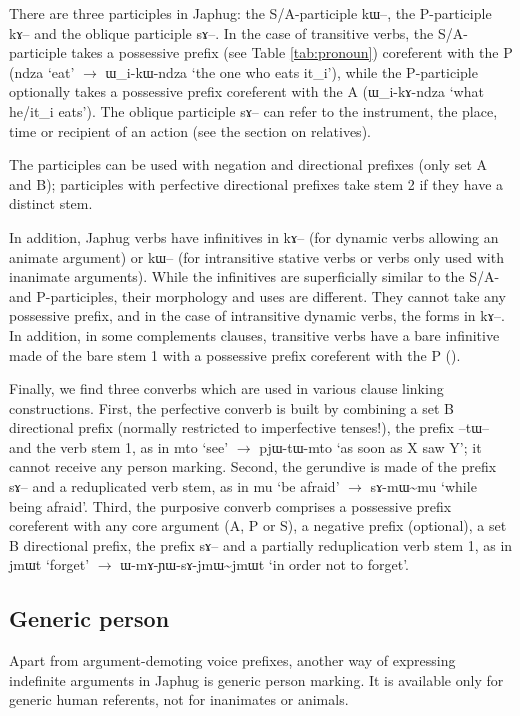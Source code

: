 \documentclass[oldfontcommands,oneside,a4paper,11pt]{article}
\newcommand{\ipa}[1]{{\phon #1}} %
\begin{document}
There are three participles in Japhug: the S/A-participle \ipa{kɯ--}, the P-participle \ipa{kɤ--} and the oblique participle \ipa{sɤ--}. In the case of transitive verbs, the S/A-participle takes a possessive prefix (see Table \ref{tab:pronoun}) coreferent with the P (\ipa{ndza} `eat' $\rightarrow$ \ipa{ɯ_i-kɯ-ndza} `the one who eats it_i'), while the P-participle optionally takes a possessive prefix coreferent with the A (\ipa{ɯ_i-kɤ-ndza} `what he/it_i eats'). The oblique participle \ipa{sɤ--} can refer to  the instrument, the place, time or recipient of an action (see the section on relatives).

The participles can be used with negation and directional prefixes (only set A and B); participles with perfective directional prefixes take stem 2 if they have a distinct stem.

In addition, Japhug verbs have infinitives in \ipa{kɤ--} (for dynamic verbs allowing an animate argument) or \ipa{kɯ--} (for intransitive stative verbs or verbs only used with inanimate arguments). While the infinitives are superficially similar to the S/A- and P-participles, their morphology and uses are different. They cannot take any possessive prefix, and in the case of intransitive dynamic verbs, the forms in \ipa{kɤ--}. In addition, in some complements clauses, transitive verbs have a bare infinitive made of the bare stem 1 with a possessive prefix coreferent with the P (\citealt{jacques14antipassive}).

Finally, we find three converbs which are used in various clause linking constructions. First, the perfective converb is built by combining a set B directional prefix (normally restricted to imperfective tenses!),  the prefix \ipa{--tɯ--} and the verb stem 1, as in \ipa{mto} `see' $\rightarrow$ \ipa{pjɯ-tɯ-mto} `as soon as X saw Y'; it cannot receive any person marking. Second, the gerundive is made of the prefix \ipa{sɤ--} and a reduplicated verb stem, as in \ipa{mu} `be afraid' $\rightarrow$ \ipa{sɤ-mɯ\textasciitilde{}mu} `while being afraid'. Third, the purposive converb comprises a possessive prefix coreferent with any core argument (A, P or S), a negative prefix (optional), a set B directional prefix, the prefix \ipa{sɤ--} and a partially reduplication verb stem 1, as in \ipa{jmɯt} `forget' $\rightarrow$ \ipa{ɯ-mɤ-ɲɯ-sɤ-jmɯ\textasciitilde{}jmɯt} `in order not to forget'.

\subsection{Generic person}
Apart from argument-demoting voice prefixes, another way of expressing indefinite arguments in Japhug is generic person marking. It is available only for generic human referents, not for inanimates or animals.
\end{document}
